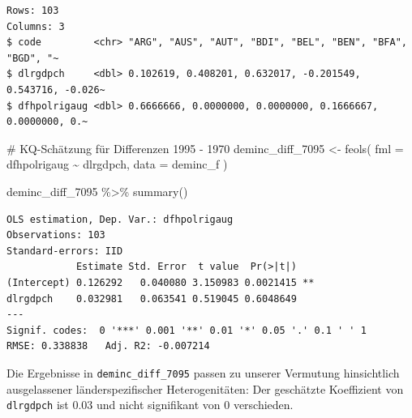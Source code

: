 \documentclass[
  a4paper,
  DIV=11,
  oneside]{scrreprt}
\newenvironment{Shaded}{\begin{snugshade}}{\end{snugshade}}
\newcommand{\AttributeTok}[1]{\textcolor[rgb]{0.40,0.45,0.13}{#1}}
\newcommand{\CommentTok}[1]{\textcolor[rgb]{0.37,0.37,0.37}{#1}}
\newcommand{\FunctionTok}[1]{\textcolor[rgb]{0.28,0.35,0.67}{#1}}
\newcommand{\NormalTok}[1]{\textcolor[rgb]{0.00,0.23,0.31}{#1}}
\newcommand{\OtherTok}[1]{\textcolor[rgb]{0.00,0.23,0.31}{#1}}
\newcommand{\SpecialCharTok}[1]{\textcolor[rgb]{0.37,0.37,0.37}{#1}}
\begin{document}
\begin{verbatim}
Rows: 103
Columns: 3
$ code         <chr> "ARG", "AUS", "AUT", "BDI", "BEL", "BEN", "BFA", "BGD", "~
$ dlrgdpch     <dbl> 0.102619, 0.408201, 0.632017, -0.201549, 0.543716, -0.026~
$ dfhpolrigaug <dbl> 0.6666666, 0.0000000, 0.0000000, 0.1666667, 0.0000000, 0.~
\end{verbatim}

\begin{Shaded}
\begin{Highlighting}[]
\CommentTok{\# KQ{-}Schätzung für Differenzen 1995 {-} 1970}
\NormalTok{deminc\_diff\_7095 }\OtherTok{\textless{}{-}} \FunctionTok{feols}\NormalTok{(}
  \AttributeTok{fml =}\NormalTok{ dfhpolrigaug }\SpecialCharTok{\textasciitilde{}}\NormalTok{ dlrgdpch,}
  \AttributeTok{data =}\NormalTok{ deminc\_f}
\NormalTok{) }

\NormalTok{deminc\_diff\_7095 }\SpecialCharTok{\%\textgreater{}\%} 
  \FunctionTok{summary}\NormalTok{()}
\end{Highlighting}
\end{Shaded}

\begin{verbatim}
OLS estimation, Dep. Var.: dfhpolrigaug
Observations: 103
Standard-errors: IID 
            Estimate Std. Error  t value  Pr(>|t|)    
(Intercept) 0.126292   0.040080 3.150983 0.0021415 ** 
dlrgdpch    0.032981   0.063541 0.519045 0.6048649    
---
Signif. codes:  0 '***' 0.001 '**' 0.01 '*' 0.05 '.' 0.1 ' ' 1
RMSE: 0.338838   Adj. R2: -0.007214
\end{verbatim}

Die Ergebnisse in \texttt{deminc\_diff\_7095} passen zu unserer
Vermutung hinsichtlich ausgelassener länderspezifischer Heterogenitäten:
Der geschätzte Koeffizient von \texttt{dlrgdpch} ist 0.03 und nicht
signifikant von 0 verschieden.
\end{document}
